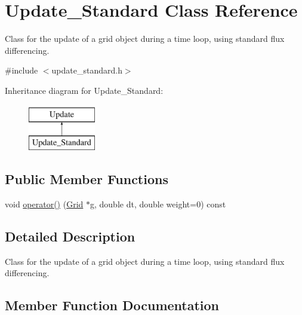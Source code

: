 \hypertarget{class_update___standard}{}\section{Update\+\_\+\+Standard Class Reference}
\label{class_update___standard}


Class for the update of a grid object during a time loop, using standard flux differencing.  




{\ttfamily \#include $<$update\+\_\+standard.\+h$>$}

Inheritance diagram for Update\+\_\+\+Standard\+:\begin{figure}[H]
\begin{center}
\leavevmode
\includegraphics[height=2.000000cm]{class_update___standard}
\end{center}
\end{figure}
\subsection*{Public Member Functions}
\begin{DoxyCompactItemize}
\item 
void \hyperlink{class_update___standard_aaea6d678d4e04d3a28e4e9e89b4a8f3f}{operator()} (\hyperlink{class_grid}{Grid} $\ast$g, double dt, double weight=0) const 
\end{DoxyCompactItemize}


\subsection{Detailed Description}
Class for the update of a grid object during a time loop, using standard flux differencing. 

\subsection{Member Function Documentation}
